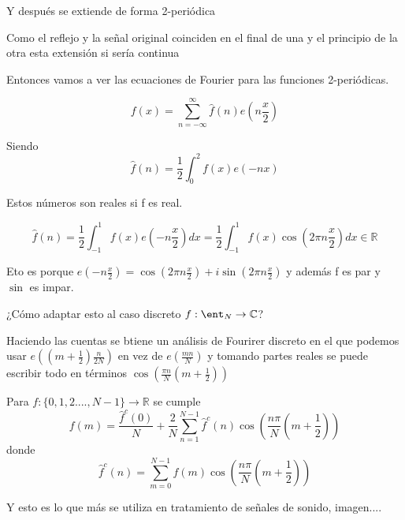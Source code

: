 \begin{itemize}
	Y después se extiende de forma 2-periódica
	
	Como el reflejo y la señal original coinciden en el final de una y el principio de la otra esta extensión si sería continua
	
	
	\begin{center}
		\centering
	\end{center}
	
	
	Entonces vamos a ver las ecuaciones de Fourier para las funciones 2-periódicas.
	
	$$f(x) = \sum_{n=-\infty}^{\infty} \widehat{f}(n)e(n\frac{x}{2})$$
	
	Siendo
	$$\widehat{f}(n) = \frac{1}{2} \int_{0}^{2} f(x) e(-nx)$$
	
	Estos números son reales si f es real.
	
	$$\widehat{f}(n) = \frac{1}{2} \int_{-1}^{1} f(x) e(-n\frac{x}{2}) dx = \frac{1}{2} \int_{-1}^{1} f(x)\cos(2\pi n \frac{x}{2})dx \in \mathbb{R}$$
	
	Eto es porque $e(-n\frac{x}{2}) = \cos(2\pi n \frac{x}{2}) + i \sin(2\pi n \frac{x}{2})$ y además f es par y $\sin$ es impar.
	
	¿Cómo adaptar esto al caso discreto $f: \ent_N \rightarrow \mathbb{C}$?
	
	\begin{center}
		\centering
	\end{center}
	
	Haciendo las cuentas se btiene un análisis de Fourirer discreto en el que podemos usar $e((m + \frac{1}{2}) \frac{n}{2N})$ en vez de $e(\frac{mn}{N})$ y tomando partes reales se puede escribir todo en términos $\cos(\frac{\pi n}{N}(m+ \frac{1}{2}))$
	
	\begin{prop}
		Para $f : \{0,1,2....,N-1\} \rightarrow \mathbb{R}$ se cumple
		$$f(m) = \frac{\widehat{f}^c(0)}{N} + \frac{2}{N} \sum_{n=1}^{N-1} \widehat{f}^c(n) \cos(\frac{n\pi}{N}(m + \frac{1}{2}))$$
		donde
		$$\widehat{f}^c(n)= \sum_{m= 0}^{N-1} f(m) \cos(\frac{n\pi}{N}(m+ \frac{1}{2}))$$
	\end{prop}
	\obs Y esto es lo que más se utiliza en tratamiento de señales de sonido, imagen....
\end{itemize}

